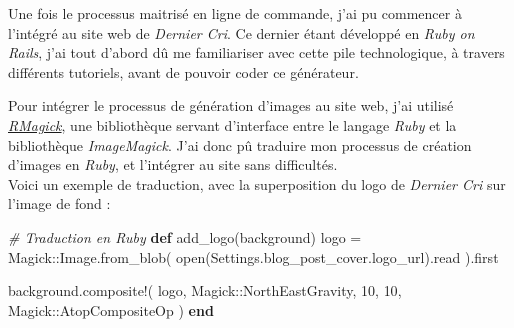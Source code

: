\documentclass[12pt,a4paper]{article}
\newenvironment{Shaded}{}{}
\newcommand{\KeywordTok}[1]{\textcolor[rgb]{0.00,0.44,0.13}{\textbf{{#1}}}}
\newcommand{\DataTypeTok}[1]{\textcolor[rgb]{0.56,0.13,0.00}{{#1}}}
\newcommand{\DecValTok}[1]{\textcolor[rgb]{0.25,0.63,0.44}{{#1}}}
\newcommand{\CommentTok}[1]{\textcolor[rgb]{0.38,0.63,0.69}{\textit{{#1}}}}
\newcommand{\VariableTok}[1]{\textcolor[rgb]{0.10,0.09,0.49}{{#1}}}
\newcommand{\ExtensionTok}[1]{{#1}}
\newcommand{\NormalTok}[1]{{#1}}
\begin{document}
  \bigskip

  Une fois le processus maitrisé en ligne de commande, j'ai pu commencer à
  l'intégré au site web de \emph{Dernier Cri}. Ce dernier étant développé
  en \emph{Ruby on Rails}, j'ai tout d'abord dû me familiariser avec cette
  pile technologique, à travers différents tutoriels, avant de pouvoir
  coder ce générateur.

  \bigskip

  Pour intégrer le processus de génération d'images au site web, j'ai
  utilisé \href{https://github.com/rmagick/rmagick}{\emph{RMagick}}, une
  bibliothèque servant d'interface entre le langage \emph{Ruby} et la
  bibliothèque \emph{ImageMagick}. J'ai donc pû traduire mon processus de
  création d'images en \emph{Ruby}, et l'intégrer au site sans
  difficultés.\\
  Voici un exemple de traduction, avec la superposition du logo de
  \emph{Dernier Cri} sur l'image de fond :

  \begin{Shaded}
  \end{Shaded}

  \begin{Shaded}
  \begin{Highlighting}[]
  \CommentTok{# Traduction en Ruby}
  \KeywordTok{def} \NormalTok{add_logo(background)}
    \NormalTok{logo = }\DataTypeTok{Magick}\NormalTok{::}\DataTypeTok{Image}\NormalTok{.from_blob(}
      \NormalTok{open(}\DataTypeTok{Settings}\NormalTok{.blog_post_cover.logo_url).read}
    \NormalTok{).first}

    \NormalTok{background.composite!(}
      \NormalTok{logo,}
      \DataTypeTok{Magick}\NormalTok{::}\DataTypeTok{NorthEastGravity}\NormalTok{,}
      \DecValTok{10}\NormalTok{,}
      \DecValTok{10}\NormalTok{,}
      \DataTypeTok{Magick}\NormalTok{::}\DataTypeTok{AtopCompositeOp}
    \NormalTok{)}
  \KeywordTok{end}
  \end{Highlighting}
  \end{Shaded}

  \bigskip
\end{document}
